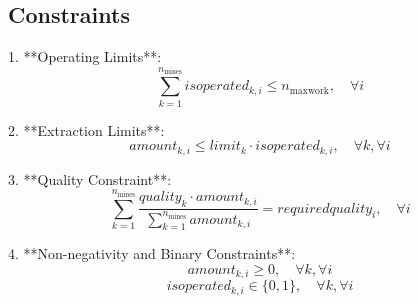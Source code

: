 \documentclass{article}
\begin{document}
\subsection*{Constraints}
1. **Operating Limits**:
\[
\sum_{k=1}^{n_{\text{mines}}} isoperated_{k,i} \leq n_{\text{maxwork}}, \quad \forall i
\]

2. **Extraction Limits**:
\[
amount_{k,i} \leq limit_k \cdot isoperated_{k,i}, \quad \forall k, \forall i
\]

3. **Quality Constraint**:
\[
\sum_{k=1}^{n_{\text{mines}}} \frac{quality_k \cdot amount_{k,i}}{\sum_{k=1}^{n_{\text{mines}}} amount_{k,i}} = requiredquality_i, \quad \forall i
\]

4. **Non-negativity and Binary Constraints**:
\[
amount_{k,i} \geq 0, \quad \forall k, \forall i
\]
\[
isoperated_{k,i} \in \{0, 1\}, \quad \forall k, \forall i
\]
\end{document}
